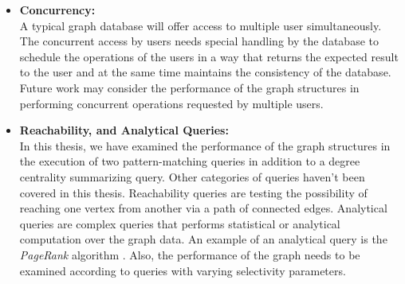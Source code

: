 {\begin{itemize}
\item \textbf{Concurrency:}\\
A typical graph database will offer access to multiple user simultaneously. The concurrent access by users needs special handling by the database to schedule the operations of the users in a way that returns the expected result to the user and at the same time maintains the consistency of the database. Future work may consider the performance of the graph structures in performing concurrent operations requested by multiple users.

\item \textbf{Reachability, and Analytical Queries:}\\
In this thesis, we have examined the performance of the graph structures in the execution of two pattern-matching queries in addition to a degree centrality summarizing query. Other categories of queries haven't been covered in this thesis. Reachability queries are testing the possibility of reaching one vertex from another via a path of connected edges. Analytical queries are complex queries that performs statistical or analytical computation over the graph data. An example of an analytical query is the \textit{PageRank} algorithm \cite{Angles2018}. Also, the performance of the graph needs to be examined according to queries with varying selectivity parameters.

\end{itemize}


}
